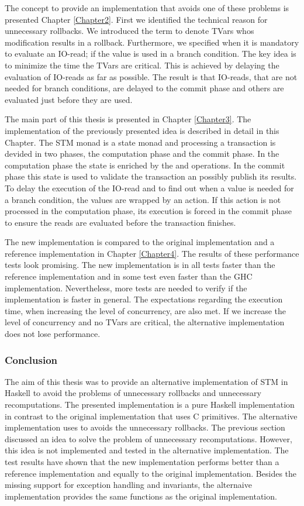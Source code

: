 The concept to provide an implementation that avoids one of these problems is presented Chapter \ref{Chapter2}.
First we identified the technical reason for unnecessary rollbacks. We introduced the term
 to denote TVars whos modification results in a rollback. Furthermore, we 
specified when it is mandatory to evaluate an IO-read; if the value is used in a branch condition.
The key idea is to minimize the time the TVars are critical. This is achieved by delaying the 
evaluation of IO-reads as far as possible. The result is that IO-reads, that are not needed for branch 
conditions, are delayed to the commit phase and others are evaluated just before they are used.

The main part of this thesis is presented in Chapter \ref{Chapter3}. The implementation of the previously 
presented idea is described in detail in this Chapter. The STM monad is a state monad and processing a
transaction is devided in two phases, the computation phase and the commit phase. In the computation
phase the state is enriched by the  and  operations. In the commit phase 
this state is used to validate the transaction an possibly publish its results. To delay the execution 
of the IO-read and to find out when a value is needed for a branch condition, the values are wrapped 
by an  action. If this action is not processed in the computation phase, its 
execution is forced in the commit phase to ensure the reads are evaluated before the transaction 
finishes. 

The new implementation is compared to the original implementation and a reference implementation in
Chapter \ref{Chapter4}. The results of these performance tests look promising. The new implementation
is in all tests faster than the reference implementation and in some test even faster than the GHC implementation.
Nevertheless, more tests are needed to verify if the implementation is faster in general. The expectations 
regarding the execution time, when increasing the level of concurrency, are also met. If we increase the 
level of concurrency and no TVars are critical, the alternative implementation does not lose performance.

\subsubsection{Conclusion}
The aim of this thesis was to provide an alternative implementation of STM in Haskell to avoid the 
problems of unnecessary rollbacks and unnecessary recomputations. The presented implementation 
is a pure Haskell implementation in contrast to the original implementation that uses C primitives.
The alternative implementation uses  to avoids the unnecessary rollbacks. 
The previous section discussed an idea to solve the problem of unnecessary recomputations. However, 
this idea is not implemented and tested in the alternative implementation. The test results have 
shown that the new implementation performs better than a reference implementation and equally to 
the original implementation. Besides the missing support for exception handling and invariants, 
the alternaive implementation provides the same functions as the original implementation. 